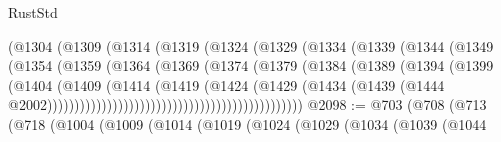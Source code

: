 \begin{lexlean}{RustStd}
\begin{coremodule}
{\begin{coremodule}
{{{{{{{{{{{{{{                                        (@1304
                                          (@1309
                                            (@1314
                                              (@1319
                                                (@1324
                                                  (@1329
                                                    (@1334
                                                      (@1339
                                                        (@1344
                                                          (@1349
                                                            (@1354
                                                              (@1359
                                                                (@1364
                                                                  (@1369
                                                                    (@1374
                                                                      (@1379
                                                                        (@1384
                                                                          (@1389
                                                                            (@1394
                                                                              (@1399
                                                                                (@1404
                                                                                  (@1409
                                                                                    (@1414
                                                                                      (@1419
                                                                                        (@1424
                                                                                          (@1429
                                                                                            (@1434
                                                                                              (@1439
                                                                                                (@1444
                                                                                                  @2002)))))))))))))))))))))))))))))))))))))))))))))))
@2098 := @703
    (@708
      (@713
        (@718
          (@1004
            (@1009
              (@1014
                (@1019
                  (@1024
                    (@1029
                      (@1034
                        (@1039
                          (@1044
}}}}}}}}}}}}}}
\end{coremodule}}
\end{coremodule}
\end{lexlean}
